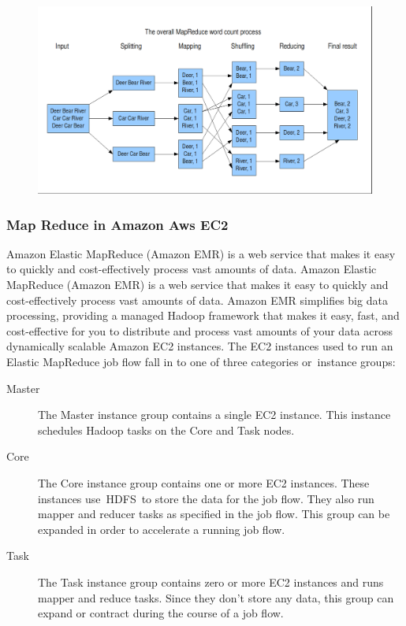 \begin{figure}[htp]
\centering
\includegraphics[scale=0.3]{Figures/fig-6.png}
\caption{}
\label{}
\end{figure}

\subsubsection{Map Reduce in Amazon Aws EC2} Amazon Elastic MapReduce (Amazon EMR) is a web service that makes it easy to quickly and cost-effectively process vast amounts of data. Amazon Elastic MapReduce (Amazon EMR) is a web service that makes it easy to quickly and cost-effectively process vast amounts of data.
Amazon EMR simplifies big data processing, providing a managed Hadoop framework that makes it easy, fast, and cost-effective for you to distribute and process vast amounts of your data across dynamically scalable Amazon EC2 instances. The EC2 instances used to run an Elastic MapReduce job flow fall in to one of three categories or instance groups:
\begin{description}
\item[Master]The Master instance group contains a single EC2 instance. This instance schedules Hadoop tasks on the Core and Task nodes.
\item[Core]The Core instance group contains one or more EC2 instances. These instances use HDFS to store the data for the job flow. They also run mapper and reducer tasks as specified in the job flow. This group can be expanded in order to accelerate a running job flow.
\item[Task]The Task instance group contains zero or more EC2 instances and runs mapper and reduce tasks. Since they don’t store any data, this group can expand or contract during the course of a job flow.
\end{description}

